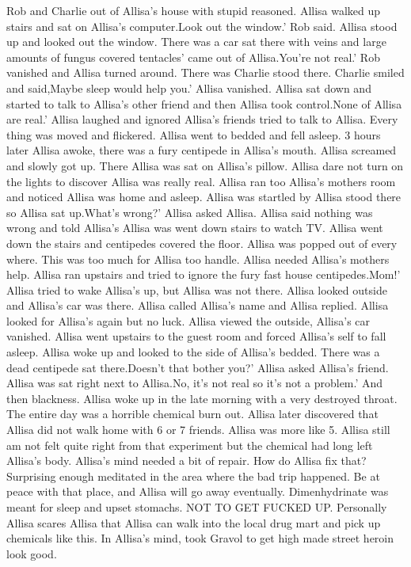 \documentclass[12pt]{book}
\begin{document}
Rob and Charlie out of Allisa's house with stupid reasoned. Allisa walked up stairs and sat on Allisa's computer.Look out the window.' Rob said. Allisa stood up and looked out the window. There was a car sat there with veins and large amounts of fungus covered tentacles' came out of Allisa.You're not real.' Rob vanished and Allisa turned around. There was Charlie stood there. Charlie smiled and said,Maybe sleep would help you.' Allisa vanished. Allisa sat down and started to talk to Allisa's other friend and then Allisa took control.None of Allisa are real.' Allisa laughed and ignored Allisa's friends tried to talk to Allisa. Every thing was moved and flickered. Allisa went to bedded and fell asleep. 3 hours later Allisa awoke, there was a fury centipede in Allisa's mouth. Allisa screamed and slowly got up. There Allisa was sat on Allisa's pillow. Allisa dare not turn on the lights to discover Allisa was really real. Allisa ran too Allisa's mothers room and noticed Allisa was home and asleep. Allisa was startled by Allisa stood there so Allisa sat up.What's wrong?' Allisa asked Allisa. Allisa said nothing was wrong and told Allisa's Allisa was went down stairs to watch TV. Allisa went down the stairs and centipedes covered the floor. Allisa was popped out of every where. This was too much for Allisa too handle. Allisa needed Allisa's mothers help. Allisa ran upstairs and tried to ignore the fury fast house centipedes.Mom!' Allisa tried to wake Allisa's up, but Allisa was not there. Allisa looked outside and Allisa's car was there. Allisa called Allisa's name and Allisa replied. Allisa looked for Allisa's again but no luck. Allisa viewed the outside, Allisa's car vanished. Allisa went upstairs to the guest room and forced Allisa's self to fall asleep. Allisa woke up and looked to the side of Allisa's bedded. There was a dead centipede sat there.Doesn't that bother you?' Allisa asked Allisa's friend. Allisa was sat right next to Allisa.No, it's not real so it's not a problem.' And then blackness. Allisa woke up in the late morning with a very destroyed throat. The entire day was a horrible chemical burn out. Allisa later discovered that Allisa did not walk home with 6 or 7 friends. Allisa was more like 5. Allisa still am not felt quite right from that experiment but the chemical had long left Allisa's body. Allisa's mind needed a bit of repair. How do Allisa fix that? Surprising enough meditated in the area where the bad trip happened. Be at peace with that place, and Allisa will go away eventually. Dimenhydrinate was meant for sleep and upset stomachs. NOT TO GET FUCKED UP. Personally Allisa scares Allisa that Allisa can walk into the local drug mart and pick up chemicals like this. In Allisa's mind, took Gravol to get high made street heroin look good.
\end{document}
